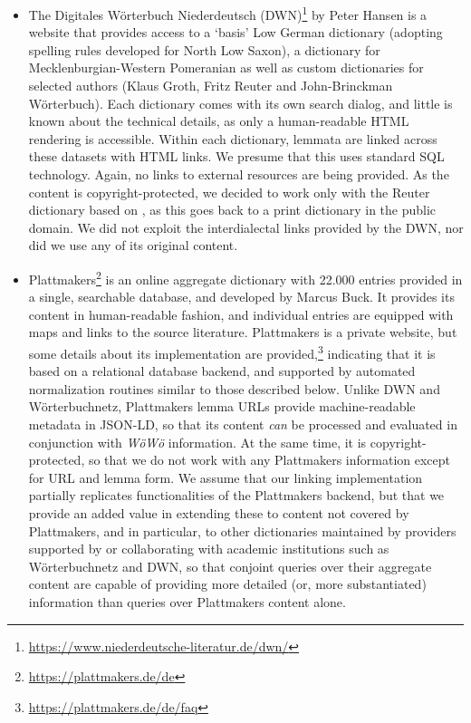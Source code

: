 \begin{itemize}
\item The Digitales Wörterbuch Niederdeutsch (DWN)\footnote{\url{https://www.niederdeutsche-literatur.de/dwn/}} by Peter Hansen is a website that provides access to a `basis' Low German dictionary (adopting spelling rules developed for North Low Saxon), a dictionary for Mecklenburgian-Western Pomeranian as well as custom dictionaries for selected authors (Klaus Groth, Fritz Reuter and John-Brinckman Wörterbuch). Each dictionary comes with its own search dialog, and little is known about the technical details, as only a human-readable HTML rendering is accessible. Within each dictionary, lemmata are linked across these datasets with HTML links. We presume that this uses standard SQL technology. Again, no links to external resources are being provided.
As the content is copyright-protected, we decided to work only with the Reuter dictionary based on \citep{muller1904reuter}, as this goes back to a print dictionary in the public domain. We did not exploit the interdialectal links provided by the DWN, nor did we use any of its original content.
\item Plattmakers\footnote{
    \url{https://plattmakers.de/de}
} is an online aggregate dictionary with 22.000 entries provided in a single, searchable database, and developed by Marcus Buck. It provides its content in human-readable fashion, and individual entries are equipped with maps and links to the source literature. Plattmakers is a private website, but some details about its implementation are provided,\footnote{\url{https://plattmakers.de/de/faq}} indicating that it is based on a relational database backend, and supported by automated normalization routines similar to those described below. Unlike DWN and Wörterbuchnetz, Plattmakers lemma URLs provide machine-readable metadata in JSON-LD, so that its content \emph{can} be processed and evaluated in conjunction with \emph{WöWö} information. At the same time, it is copyright-protected, so that we do not work with any Plattmakers information except for URL and lemma form. %
We assume that our linking implementation partially replicates functionalities of the Plattmakers backend, but that we provide an added value in extending these to content not covered by Plattmakers, and in particular, to other dictionaries maintained by providers supported by or collaborating with academic institutions such as Wörterbuchnetz and DWN, so that conjoint queries over their aggregate content are capable of providing more detailed (or, more substantiated) information than queries over Plattmakers content alone.
\end{itemize}

